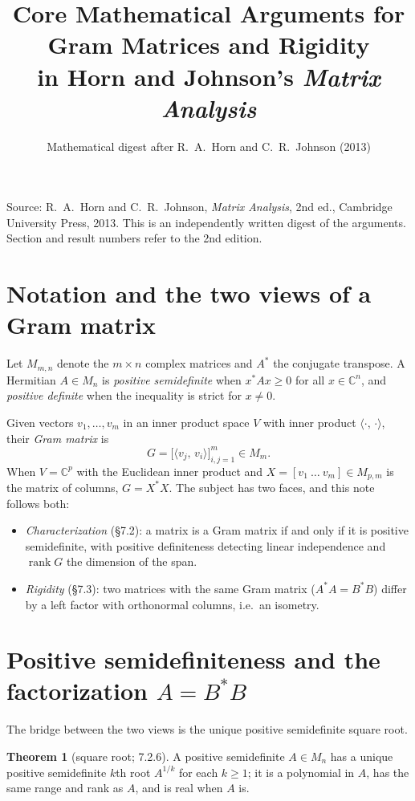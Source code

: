\documentclass[11pt]{article}
\title{Core Mathematical Arguments for Gram Matrices and Rigidity\\
in Horn and Johnson's \emph{Matrix Analysis}}
\author{Mathematical digest after R.\ A.\ Horn and C.\ R.\ Johnson (2013)}
\date{}
\newcommand{\M}{M}
\newcommand{\inner}[2]{\langle #1,\,#2\rangle}
\newcommand{\C}{\mathbb C}
\newcommand{\adj}{^{*}}
\DeclareMathOperator{\rank}{rank}
\theoremstyle{definition}
\newtheorem{theorem}{Theorem}[section]
\begin{document}
\maketitle

\begin{center}
\small
Source: R.\ A.\ Horn and C.\ R.\ Johnson, \emph{Matrix Analysis}, 2nd ed.,
Cambridge University Press, 2013.  This is an independently written digest of the
arguments.  Section and result numbers refer to the 2nd edition.
\end{center}

\section{Notation and the two views of a Gram matrix}

Let $\M_{m,n}$ denote the $m\times n$ complex matrices and $A\adj$ the conjugate
transpose.  A Hermitian $A\in\M_n$ is \emph{positive semidefinite} when
$x\adj Ax\ge 0$ for all $x\in\C^n$, and \emph{positive definite} when the
inequality is strict for $x\ne 0$.

Given vectors $v_1,\dots,v_m$ in an inner product space $V$ with inner product
$\inner{\cdot}{\cdot}$, their \emph{Gram matrix} is
\[
  G=\bigl[\inner{v_j}{v_i}\bigr]_{i,j=1}^{m}\in\M_m .
\]
When $V=\C^{p}$ with the Euclidean inner product and $X=[v_1\ \dots\ v_m]\in\M_{p,m}$
is the matrix of columns, $G=X\adj X$.  The subject has two faces, and this note
follows both:
\begin{itemize}
\item \emph{Characterization} (\S7.2): a matrix is a Gram matrix if and only if it
  is positive semidefinite, with positive definiteness detecting linear
  independence and $\rank G$ the dimension of the span.
\item \emph{Rigidity} (\S7.3): two matrices with the same Gram matrix
  ($A\adj A=B\adj B$) differ by a left factor with orthonormal columns, i.e.\ an
  isometry.
\end{itemize}

\section{Positive semidefiniteness and the factorization \texorpdfstring{$A=B\adj B$}{A=B*B}}

The bridge between the two views is the unique positive semidefinite square root.

\begin{theorem}[square root; 7.2.6]
A positive semidefinite $A\in\M_n$ has a unique positive semidefinite $k$th root
$A^{1/k}$ for each $k\ge 1$; it is a polynomial in $A$, has the same range and
rank as $A$, and is real when $A$ is.
\end{theorem}
\end{document}
